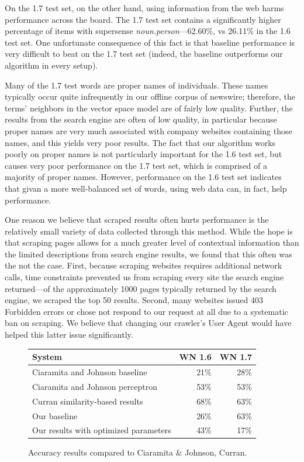 \documentclass{article}
\begin{document}
On the 1.7 test set, on the other hand, using information from the web harms performance across the board.
The 1.7 test set contains a significantly higher percentage of items with supersense {\it noun.person}---62.60\%, vs 26.11\% in the 1.6 test set.
One unfortunate consequence of this fact is that baseline performance is very difficult to beat on the 1.7 test set (indeed, the baseline outperforms our algorithm in every setup).

Many of the 1.7 test words are proper names of individuals.
These names typically occur quite infrequently in our offline corpus of newswire; therefore, the terms' neighbors in the vector space model are of fairly low quality.
Further, the results from the search engine are often of low quality, in particular because proper names are very much associated with company websites containing those names, and this yields very poor results.
The fact that our algorithm works poorly on proper names is not particularly important for the 1.6 test set, but causes very poor performance on the 1.7 test set, which is comprised of a majority of proper names.
However, performance on the 1.6 test set indicates that givan a more well-balanced set of words, using web data can, in fact, help performance.

One reason we believe that scraped results often hurts performance is the relatively small variety of data collected through this method.
While the hope is that scraping pages allows for a much greater level of contextual information than the limited descriptions from search engine results, we found that this often was the not the case.
First, because scraping websites requires additional network calls, time constraints prevented us from scraping every site the search engine returned---of the approximately 1000 pages typically returned by the search engine, we scraped the top 50 results.
Second, many websites issued 403 Forbidden errors or chose not respond to our request at all due to a systematic ban on scraping.
We believe that changing our crawler's User Agent would have helped this latter issue significantly.

\begin{figure}[hbtp]
\begin{center}
\begin{tabular}{|l|r|r|}
    \hline
    \bf{System} & \bf{WN 1.6} & \bf{WN 1.7}\\
    \hline
    \hline
    Ciaramita and Johnson baseline & 21\% & 28\%\\
    Ciaramita and Johnson perceptron & 53\% & 53\%\\
    Curran similarity-based results & 68\% & 63\%\\
    \hline
    Our baseline & 26\% & 63\%\\
    Our results with optimized parameters & 43\% & 17\%\\
    \hline
\end{tabular}
\caption{Accuracy results compared to Ciaramita \& Johnson, Curran.}
\label{fig:compareresults}
\end{center}
\end{figure}
\end{document}
